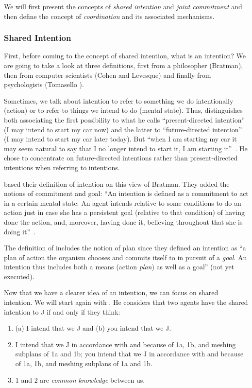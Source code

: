 \documentclass[a4paper,11pt,twoside]{StyleThese}
\begin{document}
We will first present the concepts of \emph{shared intention} and \emph{joint commitment} and then define the concept of \emph{coordination} and its associated mechanisms. 

\subsubsection{Shared Intention}
First, before coming to the concept of shared intention, what is an intention? We are going to take a look at three definitions, first from a philosopher (Bratman), then from computer scientists (Cohen and Levesque) and finally from psychologists (Tomasello \etal). 

Sometimes, we talk about intention to refer to something we do intentionally (action) or to refer to things we intend to do (mental state). Thus, \cite{bratman_1984_two} distinguishes both associating the first possibility to what he calls ``present-directed intention'' (I may intend to start my car now) and the latter to ``future-directed intention'' (I may intend to start my car later today). But ``when I am starting my car it may seem natural to say that I no longer intend to start it, I am starting it''~\citep[p.~379]{bratman_1984_two}. He chose to concentrate on future-directed intentions rather than present-directed intentions when referring to intentions. 

\cite{cohen_1990_intention} based their definition of intention on this view of Bratman. They added the notions of commitment and goal: ``An intention is defined as a commitment to act in a certain mental state: An agent intends relative to some conditions to do an action just in case she has a persistent goal (relative to that condition) of having done the action, and, moreover, having done it, believing throughout that she is doing it''~\citep[p.~496]{cohen_1991_teamwork}. 

The definition of \citet[p.~676]{tomasello_2005_understanding} includes the notion of plan since they defined an intention as ``a plan of action the organism chooses and commits itself to in pursuit of a \emph{goal}. An intention thus includes both a means (action \emph{plan}) as well as a goal'' (not yet executed). 

Now that we have a clearer idea of an intention, we can focus on shared intention. We will start again with \cite{bratman_1993_shared}. He considers that two agents have the shared intention to J if and only if they think: 
\begin{enumerate}
	\item (a) I intend that we J and (b) you intend that we J.
	\item\relax I intend that we J in accordance with and because of 1a, 1b, and meshing subplans of 1a and 1b; you intend that we J in accordance with and because of 1a, 1b, and meshing subplans of 1a and 1b.
	\item 1 and 2 are \emph{common knowledge} between us.
\end{enumerate}
\end{document}
